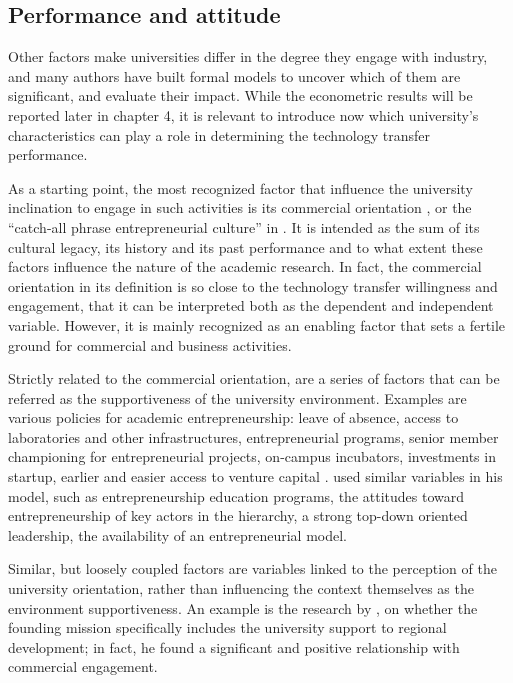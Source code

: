 
\subsection{Performance and attitude}

Other factors make universities differ in the degree they engage with industry, and many authors have built formal models to uncover which of them are significant, and evaluate their impact. While the econometric results will be reported later in chapter 4, it is relevant to introduce now which university's characteristics can play a role in determining the technology transfer performance.

As a starting point, the most recognized factor that influence the university inclination to engage in such activities is its commercial orientation \citep{DEste2007}, or the \enquote{catch-all phrase entrepreneurial culture} in \citet{OwenSmith2001}. It is intended as the sum of its cultural legacy, its history and its past performance and to what extent these factors influence the nature of the academic research. In fact, the commercial orientation in its definition is so close to the technology transfer willingness and engagement, that it can be interpreted both as the dependent and independent variable. However, it is mainly recognized as an enabling factor that sets a fertile ground for commercial and business activities. 

Strictly related to the commercial orientation, are a series of factors that can be referred as the supportiveness of the university environment. Examples are various policies for academic entrepreneurship: leave of absence, access to laboratories and other infrastructures, entrepreneurial programs, senior member championing for entrepreneurial projects, on-campus incubators, investments in startup, earlier and easier access to venture capital \citep{Baldini2007}. \citet{Guerrero2014} used similar variables in his model, such as entrepreneurship education programs, the attitudes toward entrepreneurship of key actors in the hierarchy, a strong top-down oriented leadership, the availability of an entrepreneurial model.

Similar, but loosely coupled factors are variables linked to the perception of the university orientation, rather than influencing the context themselves as the environment supportiveness. An example is the research by \citet{DEste2007}, on whether the founding mission specifically includes the university support to regional development; in fact, he found a significant and positive relationship with commercial engagement.

